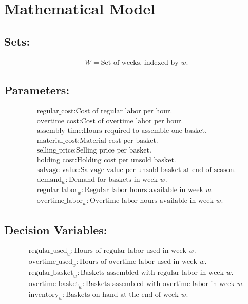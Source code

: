 \documentclass{article}
\begin{document}
\section*{Mathematical Model}

\subsection*{Sets:}
\begin{align*}
    & W = \text{Set of weeks, indexed by } w.
\end{align*}

\subsection*{Parameters:}
\begin{align*}
    & \text{regular\_cost} : \text{Cost of regular labor per hour.} \\
    & \text{overtime\_cost} : \text{Cost of overtime labor per hour.} \\
    & \text{assembly\_time} : \text{Hours required to assemble one basket.} \\
    & \text{material\_cost} : \text{Material cost per basket.} \\
    & \text{selling\_price} : \text{Selling price per basket.} \\
    & \text{holding\_cost} : \text{Holding cost per unsold basket.} \\
    & \text{salvage\_value} : \text{Salvage value per unsold basket at end of season.} \\
    & \text{demand}_w : \text{Demand for baskets in week } w. \\
    & \text{regular\_labor}_w : \text{Regular labor hours available in week } w. \\
    & \text{overtime\_labor}_w : \text{Overtime labor hours available in week } w.
\end{align*}

\subsection*{Decision Variables:}
\begin{align*}
    & \text{regular\_used}_w : \text{Hours of regular labor used in week } w. \\
    & \text{overtime\_used}_w : \text{Hours of overtime labor used in week } w. \\
    & \text{regular\_basket}_w : \text{Baskets assembled with regular labor in week } w. \\
    & \text{overtime\_basket}_w : \text{Baskets assembled with overtime labor in week } w. \\
    & \text{inventory}_w : \text{Baskets on hand at the end of week } w.
\end{align*}
\end{document}
